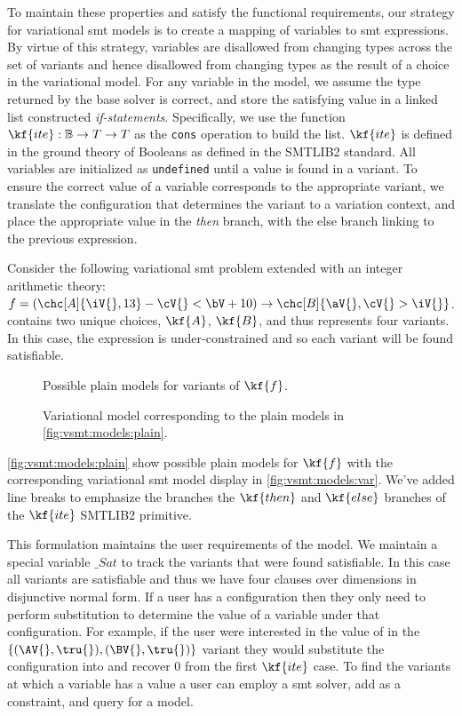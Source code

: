 To maintain these properties and satisfy the functional requirements, our
strategy for variational \ac{smt} models is to create a mapping of variables to
\ac{smt} expressions. By virtue of this strategy, variables are disallowed from
changing types across the set of variants and hence disallowed from changing
types as the result of a choice in the variational model. For any variable in
the model, we assume the type returned by the base solver is correct, and store
the satisfying value in a linked list constructed \emph{if-statements}.
Specifically, we use the function $\kf{ite} : \mathbb{B} \rightarrow T
\rightarrow T$ as the \texttt{cons} operation to build the list. $\kf{ite}$ is
defined in the ground theory of Booleans as defined in the SMTLIB2 standard. All
variables are initialized as \texttt{undefined} until a value is found in a
variant. To ensure the correct value of a variable corresponds to the
appropriate variant, we translate the configuration that determines the variant
to a variation context, and place the appropriate value in the \emph{then}
branch, with the else branch linking to the previous expression.

Consider the following variational \ac{smt} problem extended with an integer
arithmetic theory: $f = (\chc[A]{\iV{}, 13} - \cV{} < \bV + 10) \rightarrow
\chc[B]{\aV{}, \cV{} > \iV{}}$. \fV{} contains two unique choices, $\kf{A}$,
$\kf{B}$, and thus represents four variants. In this case, the expression is
under-constrained and so each variant will be found satisfiable.
%
\begin{figure}[h]
  \centering
  
  \caption{Possible plain models for variants of $\kf{f}$.}%
  \label{fig:vsmt:models:plain}
\end{figure}
\begin{figure}[h]
  \centering
  
  \caption{Variational model corresponding to the plain models in
    \autoref{fig:vsmt:models:plain}.}%
  \label{fig:vsmt:models:var}
\end{figure}

\autoref{fig:vsmt:models:plain} show possible plain models for $\kf{f}$ with the
corresponding variational \ac{smt} model display in
\autoref{fig:vsmt:models:var}. We've added line breaks to emphasize the branches
the $\kf{then}$ and $\kf{else}$ branches of the $\kf{ite}$ SMTLIB2 primitive.

This formulation maintains the user requirements of the model. We maintain a
special variable $\_Sat$ to track the variants that were found satisfiable. In
this case all variants are satisfiable and thus we have four clauses over
dimensions in disjunctive normal form. If a user has a configuration then they
only need to perform substitution to determine the value of a variable under
that configuration. For example, if the user were interested in the value of
\iV{} in the $\{(\AV{}, \tru{}), (\BV{}, \tru{})\}$ variant they would
substitute the configuration into \vc{\iV{}} and recover 0 from the first
$\kf{ite}$ case. To find the variants at which a variable has a value a user can
employ a \ac{smt} solver, add \vc{\iV{}} as a constraint, and query for a model.


